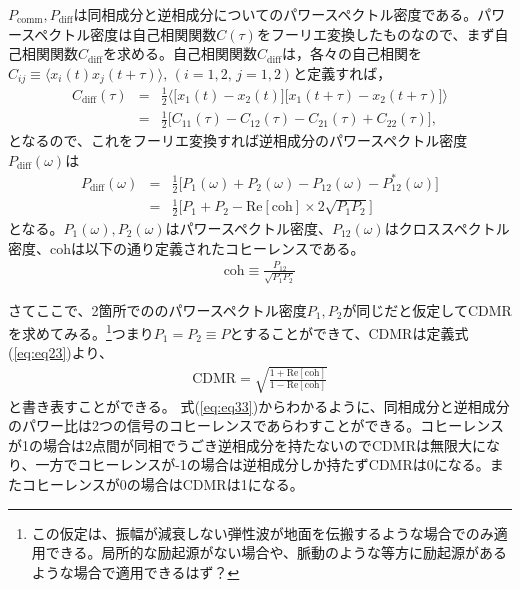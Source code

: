 \documentclass[a4paper,12pt]{jsarticle}
\begin{document}
$P_{\mathrm{comm}},P_{\mathrm{diff}}$は同相成分と逆相成分についてのパワースペクトル密度である。パワースペクトル密度は自己相関関数$C(\tau)$をフーリエ変換したものなので、まず自己相関関数$C_{\mathrm{diff}}$を求める。自己相関関数$C_{\mathrm{diff}}$は，各々の自己相関を$ C_{ij} \equiv \langle x_{i}(t)x_{j}(t+\tau)\rangle,\, (i=1,2,\,j=1,2)$と定義すれば， 
\begin{eqnarray}
  C_{\mathrm{diff}}(\tau) &=& \frac{1}{2}
  \biggl\langle
  \biggl[ x_{1}(t)-x_{2}(t) \biggr] \biggl[ x_{1}(t+\tau)-x_{2}(t+\tau) \biggr]
  \biggr\rangle \\
  &=& \frac{1}{2}\biggl[ C_{11}(\tau) - C_{12}(\tau) - C_{21}(\tau) + C_{22}(\tau) \biggr], 
\end{eqnarray}
となるので、これをフーリエ変換すれば逆相成分のパワースペクトル密度$P_{\mathrm{diff}}(\omega)$は
\begin{eqnarray}
  P_{\mathrm{diff}}(\omega) &=& \frac{1}{2}\biggl[ P_{1}(\omega) + P_{2}(\omega) - P_{12}(\omega) - P_{12}^*(\omega) \biggr]\\
  &=& \frac{1}{2} \biggl[ P_{1}+P_{2} - \mathrm{Re}\left[\mathrm{coh} \right]\times2\sqrt{P_{1}P_{2}} \biggr] \label{eq:eq31}
\end{eqnarray}
となる。$P_{1}(\omega),P_{2}(\omega)$はパワースペクトル密度、$P_{12}(\omega)$はクロススペクトル密度、$\mathrm{coh}$は以下の通り定義されたコヒーレンスである。
\begin{eqnarray}
  \mathrm{coh} \equiv \frac{P_{12}}{\sqrt{P_{1}P_{2}}}
\end{eqnarray}


さてここで、2箇所でののパワースペクトル密度$P_{1},P_{2}$が同じだと仮定してCDMRを求めてみる。\footnote[3]{この仮定は、振幅が減衰しない弾性波が地面を伝搬するような場合でのみ適用できる。局所的な励起源がない場合や、脈動のような等方に励起源があるような場合で適用できるはず？}つまり$P_{1}=P_{2}\equiv P$とすることができて、$\mathrm{CDMR}$は定義式(\ref{eq:eq23})より、
\begin{eqnarray}
 \mathrm{CDMR} = \sqrt{\frac{1 + \mathrm{Re} \left[\mathrm{coh} \right] }{1 - \mathrm{Re} \left[\mathrm{coh} \right]}} \label{eq:eq33}
\end{eqnarray}
と書き表すことができる。
式(\ref{eq:eq33})からわかるように、同相成分と逆相成分のパワー比は2つの信号のコヒーレンスであらわすことができる。コヒーレンスが1の場合は2点間が同相でうごき逆相成分を持たないのでCDMRは無限大になり、一方でコヒーレンスが-1の場合は逆相成分しか持たずCDMRは0になる。またコヒーレンスが0の場合はCDMRは1になる。
\end{document}
